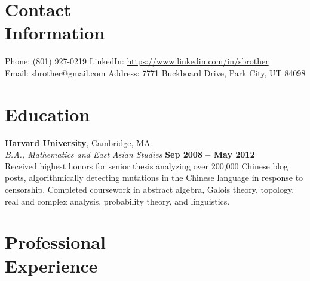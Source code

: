 \documentclass[margin,line]{resume}
\begin{document}
\begin{resume}
    \section{\mysidestyle Contact\\Information}

    Phone: (801) 927-0219       \hfill LinkedIn: \url{https://www.linkedin.com/in/sbrother} \\
    \noindent Email: sbrother@gmail.com  \hfill Address: 7771 Buckboard Drive, Park City, UT 84098 \vspace{0mm}\\\vspace{-4.5mm}

    \section{\mysidestyle Education}

    \textbf{Harvard University}, Cambridge, MA \vspace{2mm}\\\vspace{1mm}%
    \textsl{B.A., Mathematics and East Asian Studies} \hfill \textbf{Sep 2008 -- May 2012}\\
    Received highest honors for senior thesis analyzing over 200,000 Chinese
    blog posts, algorithmically detecting mutations in the Chinese language in
    response to censorship. Completed coursework in abstract algebra,
    Galois theory, topology, real and complex analysis, probability theory, and
    linguistics.

    \section{\mysidestyle Professional\\Experience}


\end{resume}
\end{document}
